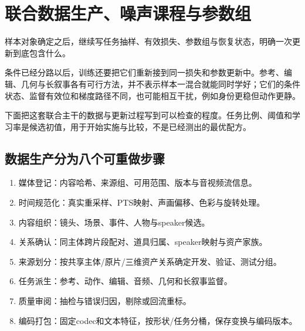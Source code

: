 \chapter{联合数据生产、噪声课程与参数组}\label{seedance-m25}

样本对象确定之后，继续写任务抽样、有效损失、参数组与恢复状态，明确一次更新到底包含什么。

条件已经分路以后，训练还要把它们重新接到同一损失和参数更新中。参考、编辑、几何与长叙事各有可行方法，并不表示样本一混合就能同时学好；它们的条件状态、监督有效位和梯度路径不同，也可能相互干扰，例如身份更稳但动作更静。

下面把这套联合主干的数据与更新过程写到可以检查的程度。任务比例、阈值和学习率是候选初值，用于开始实施与比较，不是已经测出的最优配方。

\section{数据生产分为八个可重做步骤}\label{seedance-m25-ux6570ux636eux751fux4ea7ux5206ux4e3aux516bux4e2aux53efux91cdux505aux6b65ux9aa4}

\begin{enumerate}
\def\labelenumi{\arabic{enumi}.}
\tightlist
\item
  媒体登记：内容哈希、来源组、可用范围、版本与音视频流信息。
\item
  时间规范化：真实重采样、PTS映射、声画偏移、色彩与旋转处理。
\item
  内容组织：镜头、场景、事件、人物与speaker候选。
\item
  关系确认：同主体跨片段配对、道具归属、speaker映射与资产家族。
\item
  来源划分：按共享主体/原片/三维资产关系确定开发、验证、测试分组。
\item
  任务派生：参考、动作、编辑、音频、几何和长叙事监督。
\item
  质量审阅：抽检与错误归因，剔除或回流重标。
\item
  编码打包：固定codec和文本特征，按形状/任务分桶，保存变换与编码版本。
\end{enumerate}

